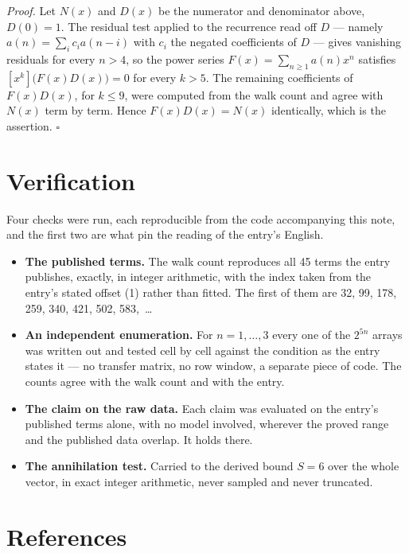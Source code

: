 \documentclass[11pt]{article}
\theoremstyle{definition}
\begin{document}
{\itshape Proof.} Let $N(x)$ and $D(x)$ be the numerator and denominator above, $D(0)=1$. The residual test applied to the recurrence read off $D$ --- namely $a(n) = \sum_i c_i a(n-i)$ with $c_i$ the negated coefficients of $D$ --- gives vanishing residuals for every $n > 4$, so the power series $F(x)=\sum_{n\ge 1}a(n)x^n$ satisfies $[x^k]\bigl(F(x)D(x)\bigr) = 0$ for every $k > 5$. The remaining coefficients of $F(x)D(x)$, for $k \le 9$, were computed from the walk count and agree with $N(x)$ term by term. Hence $F(x)D(x) = N(x)$ identically, which is the assertion. $\square$

\section{Verification}

Four checks were run, each reproducible from the code accompanying this note, and the first two are what pin the reading of the entry's English.

\begin{itemize}

\item {\bfseries The published terms.} The walk count reproduces all 45 terms the entry publishes, exactly, in integer arithmetic, with the index taken from the entry's stated offset (1) rather than fitted. The first of them are 32, 99, 178, 259, 340, 421, 502, 583,~\dots

\item {\bfseries An independent enumeration.} For $n = 1,\dots,3$ every one of the $2^{5n}$ arrays was written out and tested cell by cell against the condition as the entry states it --- no transfer matrix, no row window, a separate piece of code. The counts agree with the walk count and with the entry.

\item {\bfseries The claim on the raw data.} Each claim was evaluated on the entry's published terms alone, with no model involved, wherever the proved range and the published data overlap. It holds there.

\item {\bfseries The annihilation test.} Carried to the derived bound $S = 6$ over the whole vector, in exact integer arithmetic, never sampled and never truncated.

\end{itemize}

\section{References}
\end{document}
